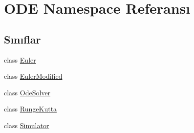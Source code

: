 \hypertarget{namespaceODE}{}\section{O\+DE Namespace Referansı}
\label{namespaceODE}
\subsection*{Sınıflar}
\begin{DoxyCompactItemize}
\item 
class \mbox{\hyperlink{classODE_1_1Euler}{Euler}}
\item 
class \mbox{\hyperlink{classODE_1_1EulerModified}{Euler\+Modified}}
\item 
class \mbox{\hyperlink{classODE_1_1OdeSolver}{Ode\+Solver}}
\item 
class \mbox{\hyperlink{classODE_1_1RungeKutta}{Runge\+Kutta}}
\item 
class \mbox{\hyperlink{classODE_1_1Simulator}{Simulator}}
\end{DoxyCompactItemize}
